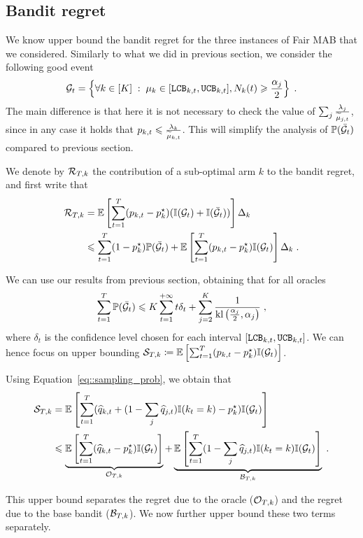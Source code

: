 \subsection{Bandit regret}

We know upper bound the bandit regret for the three instances of Fair MAB that we considered. Similarly to what we did in previous section, we consider the following good event
 \[\mathcal{G}_t=\left\{ \forall k \in [K]\;:\; \mu_k \in [\texttt{LCB}_{k, t}, \texttt{UCB}_{k, t}], N_k(t)\geqslant \frac{\alpha_j}{2} \right\}\;.\]
 The main difference is that here it is not necessary to check the value of $\sum_j \frac{\lambda_j}{\widetilde{\mu}_{j,t}}$, since in any case it holds that $p_{k,t}\leqslant \frac{\lambda_k}{\widetilde{\mu}_{k,t}}$. This will simplify the analysis of $\mathbb{P}(\bar {\mathcal{G}}_t)$ compared to previous section.

We denote by $\mathcal{R}_{T,k}$ the contribution of a sub-optimal arm $k$ to the bandit regret, and first write that 
\begin{align*}
\mathcal{R}_{T,k} &= \mathbb{E}\left[\sum_{t=1}^T (p_{k,t} - p^\star_k)(\mathbb{I}(\mathcal{G}_t)+\mathbb{I}(\bar {\mathcal{G}}_t))\right]\Delta_k \\
& \leqslant \sum_{t=1}^T (1-p_k^\star) \mathbb{P}(\bar {\mathcal{G}}_t) + \mathbb{E}\left[\sum_{t=1}^T (p_{k,t} - p_k^\star)\mathbb{I}(\mathcal{G}_t)\right] \Delta_k \;.
\end{align*}

We can use our results from previous section, obtaining that for all oracles 
\[\sum_{t=1}^T \mathbb{P}(\bar {\mathcal{G}}_t) \leqslant K \sum_{t=1}^{+\infty} t\delta_t + \sum_{j=2}^K\frac{1}{\text{\normalfont kl}\left(\frac{\alpha_j}{2}, \alpha_j\right)}\;, \]
where $\delta_t$ is the confidence level chosen for each interval $[\texttt{LCB}_{k,t}, \texttt{UCB}_{k,t}]$. We can hence focus on upper bounding $\mathcal{S}_{T, k} \coloneqq \mathbb{E}\left[\sum_{t=1}^T (p_{k,t} - p_k^\star)\mathbb{I}(\mathcal{G}_t)\right]$. 

Using Equation~\eqref{eq::sampling_prob}, we obtain that 
\begin{align*}\mathcal{S}_{T,k} &= \mathbb{E}\left[\sum_{t=1}^T (\widehat{q}_{k, t} + (1-\sum_j \widehat{q}_{j, t}) \mathbb{I}(k_t=k) - p_k^\star)\mathbb{I}(\mathcal{G}_t)\right] \\
& \leqslant   \underbrace{\mathbb{E}\left[\sum_{t=1}^T (\widehat{q}_{k, t}-p_k^\star) \mathbb{I}(\mathcal{G}_t)\right]}_{\mathcal{O}_{ T,k}} + \underbrace{\mathbb{E}\left[\sum_{t=1}^T (1-\sum_j \widehat{q}_{j, t}) \mathbb{I}(k_t=k)\mathbb{I}(\mathcal{G}_t)\right]}_{\mathcal{B}_{T,k}} \;.
\end{align*}

This upper bound separates the regret due to the oracle ($\mathcal{O}_{T,k}$) and the regret due to the base bandit ($\mathcal{B}_{T,k}$). We now further upper bound these two terms separately.

